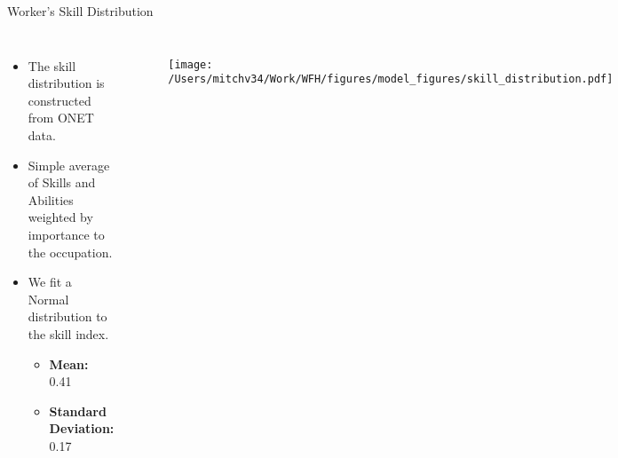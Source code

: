 \documentclass[aspectratio=1610]{beamer}
\begin{document}
\begin{frame}[label=appendix_worker_skill]{Worker's Skill Distribution}
    \begin{columns}
        \begin{itemize}\footnotesize
            \item The skill distribution is constructed from ONET data.
            \item Simple average of Skills and Abilities weighted by importance to the occupation.
            \item We fit a Normal distribution to the skill index.
            \begin{itemize}\footnotesize
                \item \textbf{Mean:} 0.41
                \item \textbf{Standard Deviation:} 0.17
            \end{itemize}
        \end{itemize}
        \begin{figure}
            \centering
            \texttt{[image: /Users/mitchv34/Work/WFH/figures/model\_figures/skill\_distribution.pdf]}
        \end{figure}
    \end{columns}
    \hyperlink{calibration_overview}{}
\end{frame}
\end{document}
